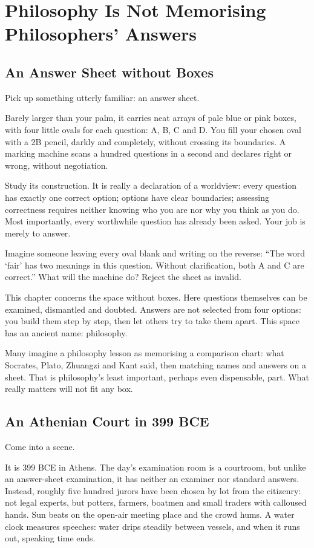 \chapter[Philosophy Is Not Memorising Answers]{Philosophy Is Not Memorising Philosophers' Answers}
\section{An Answer Sheet without Boxes}
Pick up something utterly familiar: an answer sheet.

Barely larger than your palm, it carries neat arrays of pale blue or pink boxes, with four little ovals for each question: A, B, C and D. You fill your chosen oval with a 2B pencil, darkly and completely, without crossing its boundaries. A marking machine scans a hundred questions in a second and declares right or wrong, without negotiation.

Study its construction. It is really a declaration of a worldview: every question has exactly one correct option; options have clear boundaries; assessing correctness requires neither knowing who you are nor why you think as you do. Most importantly, every worthwhile question has already been asked. Your job is merely to answer.

Imagine someone leaving every oval blank and writing on the reverse: ``The word `fair' has two meanings in this question. Without clarification, both A and C are correct.'' What will the machine do? Reject the sheet as invalid.

This chapter concerns the space without boxes. Here questions themselves can be examined, dismantled and doubted. Answers are not selected from four options: you build them step by step, then let others try to take them apart. This space has an ancient name: philosophy.

Many imagine a philosophy lesson as memorising a comparison chart: what Socrates, Plato, Zhuangzi and Kant said, then matching names and answers on a sheet. That is philosophy's least important, perhaps even dispensable, part. What really matters will not fit any box.

\section{An Athenian Court in 399 BCE}
Come into a scene.

It is 399 BCE in Athens. The day's examination room is a courtroom, but unlike an answer-sheet examination, it has neither an examiner nor standard answers. Instead, roughly five hundred jurors have been chosen by lot from the citizenry: not legal experts, but potters, farmers, boatmen and small traders with calloused hands. Sun beats on the open-air meeting place and the crowd hums. A water clock measures speeches: water drips steadily between vessels, and when it runs out, speaking time ends.


